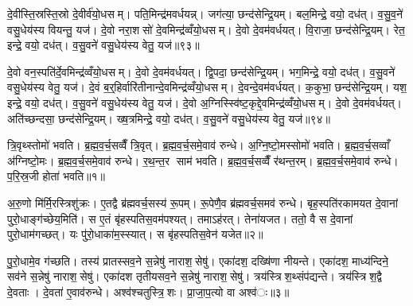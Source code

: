 दे॒वीस्ति॒स्रस्ति॒स्रो दे॒वीर्व॑यो॒धसम्। पति॒मिन्द्र॑मवर्धयन्न्। जग॑त्या॒ छन्द॑सेन्द्रि॒यम्। बल॒मिन्द्रे॒ वयो॒ दध॑त्। व॒सु॒व॒ने॑ वसु॒धेय॑स्य वियन्तु॒ यज॑। दे॒वो नरा॒शसो॑ दे॒वमिन्द्र॑व्वँयो॒धसम्। दे॒वो दे॒वम॑वर्धयत्। वि॒राजा॒ छन्द॑सेन्द्रि॒यम्। रेत॒ इन्द्रे॒ वयो॒ दध॑त्। व॒सु॒वने॑ वसु॒धेय॑स्य वेतु॒ यज॑॥९३॥

दे॒वो वन॒स्पति॑र्दे॒वमिन्द्र॑व्वँयो॒धसम्। दे॒वो दे॒वम॑वर्धयत्। द्वि॒पदा॒ छन्द॑सेन्द्रि॒यम्। भग॒मिन्द्रे॒ वयो॒ दध॑त्। व॒सु॒वने॑ वसु॒धेय॑स्य वेतु॒ यज॑। दे॒वं ब॒र्॒हिर्वारि॑तीनान्दे॒वमिन्द्र॑व्वँयो॒धसम्। दे॒वन्दे॒वम॑वर्धयत्। क॒कुभा॒ छन्द॑सेन्द्रि॒यम्। यश॒ इन्द्रे॒ वयो॒ दध॑त्। व॒सु॒वने॑ वसु॒धेय॑स्य वेतु॒ यज॑। दे॒वो अ॒ग्निस्स्वि॑ष्ट॒कृद्दे॒वमिन्द्र॑व्वँयो॒धसम्। दे॒वो दे॒वम॑वर्धयत्। अति॑च्छन्दसा॒ छन्द॑सेन्द्रि॒यम्। ख्ष॒त्रमिन्द्रे॒ वयो॒ दध॑त्। व॒सु॒वने॑ वसु॒धेय॑स्य वेतु॒ यज॑॥९४॥




त्रि॒वृथ्स्तोमो॑ भवति। ब्र॒ह्म॒व॒र्च॒सव्वैँ त्रि॒वृत्। ब्र॒ह्म॒व॒र्च॒समे॒वाव॑ रुन्धे। अ॒ग्नि॒ष्टो॒मस्सोमो॑ भवति। ब्र॒ह्म॒व॒र्च॒सव्वाँ अ॑ग्निष्टो॒मः। ब्र॒ह्म॒व॒र्च॒समे॒वाव॑ रुन्धे। र॒थ॒न्त॒र साम॑ भवति। ब्र॒ह्म॒व॒र्च॒सव्वैँ र॑थन्त॒रम्। ब्र॒ह्म॒व॒र्च॒समे॒वाव॑ रुन्धे। प॒रि॒स्र॒जी होता॑ भवति॥१॥

अ॒रु॒णो मि॑र्मि॒रस्त्रिशु॑क्रः। ए॒तद्वै ब्र॑ह्मवर्च॒सस्य॑ रू॒पम्। रू॒पेणै॒व ब्र॑ह्मवर्च॒समव॑ रुन्धे। बृह॒स्पति॑रकामयत दे॒वानां पुरो॒धाङ्ग॑च्छेय॒मिति॑। स ए॒तं बृ॑हस्पतिस॒वम॑पश्यत्। तमाऽह॑रत्। तेना॑यजत। ततो॒ वै स दे॒वानां पुरो॒धाम॑गच्छत्। यः पु॑रो॒धाका॑म॒स्स्यात्। स बृ॑हस्पतिस॒वेन॑ यजेत॥२॥

पु॒रो॒धामे॒व ग॑च्छति। तस्य॑ प्रातस्सव॒ने स॒न्नेषु॑ नाराश॒सेषु॑। एका॑दश॒ दख्षि॑णा नीयन्ते। एका॑दश॒ माध्य॑न्दिने॒ सव॑ने स॒न्नेषु॑ नाराश॒सेषु॑। एका॑दश तृतीयसव॒ने स॒न्नेषु॑ नाराश॒सेषु॑। त्रय॑स्त्रिश॒थ्संप॑द्यन्ते। त्रय॑स्त्रिश॒द्वै दे॒वताः। दे॒वता॑ ए॒वाव॑रुन्धे। अश्व॑श्चतुस्त्रि॒शः। प्रा॒जा॒प॒त्यो वा अश्व॑ः॥३॥

